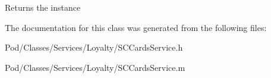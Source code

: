 \begin{DoxyReturn}{Returns}
the instance 
\end{DoxyReturn}


The documentation for this class was generated from the following files\+:\begin{DoxyCompactItemize}
\item 
Pod/\+Classes/\+Services/\+Loyalty/S\+C\+Cards\+Service.\+h\item 
Pod/\+Classes/\+Services/\+Loyalty/S\+C\+Cards\+Service.\+m\end{DoxyCompactItemize}
